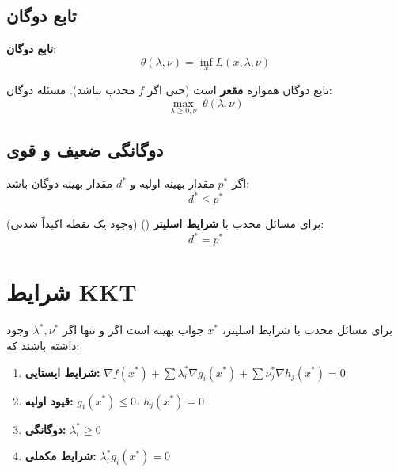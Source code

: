\documentclass{matinbook}
\begin{document}
    \subsection{تابع دوگان}
    
    \begin{definition}
        \textbf{تابع دوگان}:
        \[
        \theta(\lambda, \nu) =
        \inf_{x} L(x, \lambda, \nu)
        \]
        \label{def:dual-function}
    \end{definition}
    
    تابع دوگان همواره \textbf{مقعر} است
    (حتی اگر $f$ محدب نباشد).
    مسئله دوگان:
    \[
    \max_{\lambda \geq 0, \nu} \;
    \theta(\lambda, \nu)
    \]
    
    \subsection{دوگانگی ضعیف و قوی}
    
    \begin{theorem}
        اگر $p^{*}$ مقدار بهینه اولیه و
        $d^{*}$ مقدار بهینه دوگان باشد:
        \[
        d^{*} \leq p^{*}
        \]
        \label{thm:weak-duality}
    \end{theorem}
    
    \begin{theorem}
        برای مسائل محدب با
        \textbf{شرایط اسلیتر} ()
        (وجود یک نقطه اکیداً شدنی):
        \[
        d^{*} = p^{*}
        \]
        \label{thm:strong-duality}
    \end{theorem}
    
    \section{شرایط KKT}
    
    \begin{theorem}
        برای مسائل محدب با شرایط اسلیتر،
        $x^{*}$ جواب بهینه است اگر و تنها اگر
        $\lambda^{*}, \nu^{*}$ وجود داشته باشند که:
        \begin{enumerate}
            \item \textbf{شرایط ایستایی:}
            $\nabla f(x^{*}) + \sum \lambda_{i}^{*} \nabla g_{i}(x^{*})
            + \sum \nu_{j}^{*} \nabla h_{j}(x^{*}) = 0$
            \item \textbf{قیود اولیه:}
            $g_{i}(x^{*}) \leq 0$، $h_{j}(x^{*}) = 0$
            \item \textbf{دوگانگی:}
            $\lambda_{i}^{*} \geq 0$
            \item \textbf{شرایط مکملی:}
            $\lambda_{i}^{*} g_{i}(x^{*}) = 0$
        \end{enumerate}
        \label{thm:kkt}
    \end{theorem}
    
\end{document}
